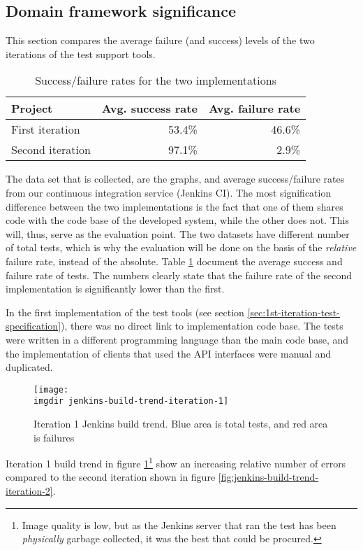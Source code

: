 \subsection{Domain framework significance}
\label{ssec:first-and-second-iteration-differences}
This section compares the average failure (and success) levels of the two iterations of the test support tools.
\begin{table}[!htbp]
\centering
\begin{tabular}{ | l | r | r |}
   \hline
   Project          & Avg. success rate & Avg. failure rate \\ \hline
   First iteration  & 53.4\%            & 46.6\%            \\
   Second iteration & 97.1\%            & 2.9\%             \\
   \hline
\end{tabular}
\caption{Success/failure rates for the two implementations}
\label{tab:jenkins-failure-rates}
\end{table}
The data set that is collected, are the graphs, and average success/failure rates from our continuous integration service (Jenkins CI). The most signification difference between the two implementations is the fact that one of them shares code with the code base of the developed system, while the other does not. This will, thus, serve as the evaluation point. The two datasets have different number of total tests, which is why the evaluation will be done on the basis of the \emph{relative} failure rate, instead of the absolute. Table \ref{tab:jenkins-failure-rates} document the average success and failure rate of tests. The numbers clearly state that the failure rate of the second implementation is significantly lower than the first. \medskip

\noindent In the first implementation of the test tools (see section \ref{sec:1st-iteration-test-specification}), there was no direct link to implementation code base. The tests were written in a different programming language than the main code base, and the implementation of clients that used the API interfaces were manual and duplicated.\medskip
\begin{figure}[!hbpt]
\centering
\texttt{[image: \\imgdir jenkins-build-trend-iteration-1]}
\caption{Iteration 1 Jenkins build trend. Blue area is total tests, and red area is failures}
\label{fig:jenkins-build-trend-iteration-1}
\end{figure}

\noindent Iteration 1 build trend in figure \ref{fig:jenkins-build-trend-iteration-1}\footnote{Image quality is low, but as the Jenkins server that ran the test has been \emph{physically} garbage collected, it was the best that could be procured.} show an increasing relative number of errors compared to the second iteration shown in figure \ref{fig:jenkins-build-trend-iteration-2}.\medskip

